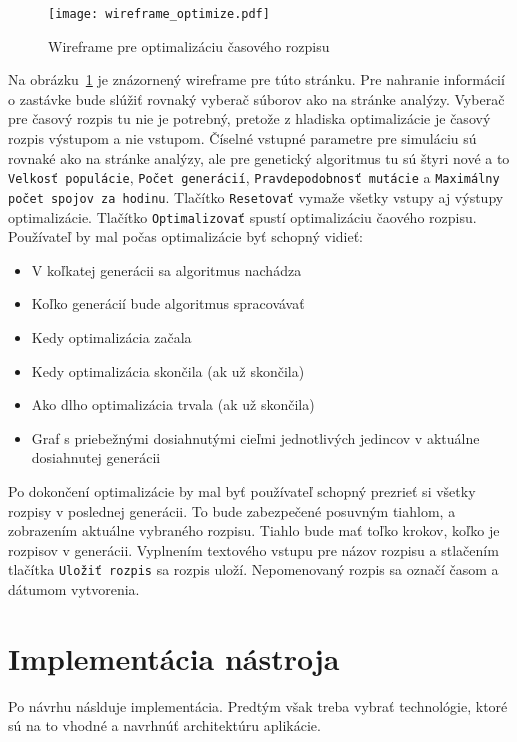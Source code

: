 \begin{figure}[h]\label{fig:wireframe_optimize}
  \centering
  \texttt{[image: wireframe\_optimize.pdf]}
  \caption{Wireframe pre optimalizáciu časového rozpisu}
\end{figure}

Na obrázku~\ref{fig:wireframe_optimize} je znázornený wireframe pre túto stránku.
Pre nahranie informácií o zastávke bude slúžiť rovnaký vyberač súborov ako na stránke analýzy.
Vyberač pre časový rozpis tu nie je potrebný, pretože z hladiska optimalizácie je časový rozpis výstupom a nie vstupom.
Číselné vstupné parametre pre simuláciu sú rovnaké ako na stránke analýzy, ale pre genetický algoritmus tu sú štyri nové a to \texttt{Velkosť populácie}, \texttt{Počet generácií}, \texttt{Pravdepodobnosť mutácie} a \texttt{Maximálny počet spojov za hodinu}.
Tlačítko \texttt{Resetovať} vymaže všetky vstupy aj výstupy optimalizácie.
Tlačítko \texttt{Optimalizovať} spustí optimalizáciu čaového rozpisu.
Používateľ by mal počas optimalizácie byť schopný vidieť:
\begin{itemize}
  \item V koľkatej generácii sa algoritmus nachádza
  \item Koľko generácií bude algoritmus spracovávať
  \item Kedy optimalizácia začala
  \item Kedy optimalizácia skončila (ak už skončila)
  \item Ako dlho optimalizácia trvala (ak už skončila)
  \item Graf s priebežnými dosiahnutými cieľmi jednotlivých jedincov v aktuálne dosiahnutej generácii
\end{itemize}
Po dokončení optimalizácie by mal byť používateľ schopný prezrieť si všetky rozpisy v poslednej generácii.
To bude zabezpečené posuvným tiahlom, a zobrazením aktuálne vybraného rozpisu.
Tiahlo bude mať toľko krokov, koľko je rozpisov v generácii.
Vyplnením textového vstupu pre názov rozpisu a stlačením tlačítka \texttt{Uložiť rozpis} sa rozpis uloží.
Nepomenovaný rozpis sa označí časom a dátumom vytvorenia.

\section{Implementácia nástroja}\label{nastroj_implementacia}

Po návrhu náslduje implementácia.
Predtým však treba vybrať technológie, ktoré sú na to vhodné a navrhnúť architektúru aplikácie.


